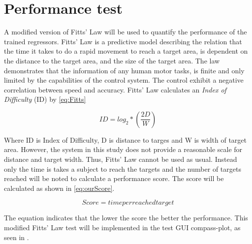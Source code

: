 \section{Performance test}

A modified version of Fitts' Law will be used to quantify the performance of the trained regressors. Fitts' Law is a predictive model describing the relation that the time it takes to do a rapid movement to reach a target area, is dependent on the distance to the target area, and the size of the target area. The law demonstrates that the information of any human motor tasks, is finite and only limited by the capabilities of the control system. The control exhibit a negative correlation between speed and accuracy. \cite{Kamavuako2014}
Fitts' Law calculates an \textit{Index of Difficulty} (ID) by \eqref{eq:Fitts}

\begin{equation} \label{eq:Fitts}
ID = log_{2} * (\frac{2D}{W})
\end{equation}

Where ID is Index of Difficulty, D is distance to targes and W is width of target area. However, the system in this study does not provide a reasonable scale for distance and target width. Thus, Fitts' Law cannot be used as usual. Instead only the time is takes a subject to reach the targets and the number of targets reached will be noted to calculate a performance score. The score will be calculated as shown in \eqref{eq:ourScore}.

\begin{equation} \label{eq:ourScore}
	Score = time per reached target
\end{equation}

The equation indicates that the lower the score the better the performance. This modified Fitts' Law test will be implemented in the test GUI compass-plot, as seen in . 

